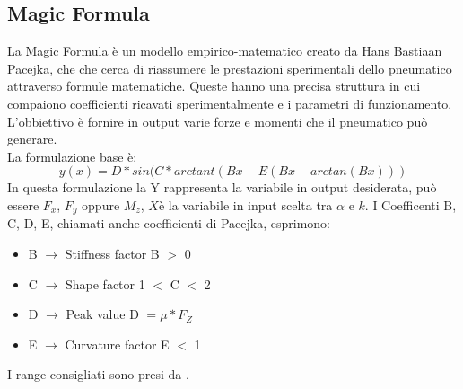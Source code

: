 \subsection{Magic Formula}
La Magic Formula è un modello empirico-matematico creato da Hans Bastiaan Pacejka, che che cerca di riassumere le prestazioni sperimentali dello pneumatico attraverso formule matematiche. Queste hanno una precisa struttura in cui compaiono coefficienti ricavati sperimentalmente e i parametri di funzionamento. L'obbiettivo è fornire in output varie forze e momenti che il pneumatico può generare.\\
La formulazione base è:
\begin{equation}
\label{eq:Pacjeka}
    y(x)=D*sin(C*arctant(Bx-E(Bx-arctan(Bx)))
\end{equation}
In questa formulazione la Y rappresenta la variabile in output desiderata, può essere
$F_x$, $F_y$ oppure $M_z$, $X$è la variabile in input scelta tra $\alpha$ e $k$. I Coefficenti B, C, D, E, chiamati anche coefficienti di Pacejka, esprimono:
\begin{itemize}
    \item B $\longrightarrow$ Stiffness factor \hspace{2.3cm} B $>$ 0
    \item C $\longrightarrow$ Shape factor     \hspace{2.3cm} 1 $<$ C $<$ 2
    \item D $\longrightarrow$ Peak value       \hspace{2.6cm} D $= \mu*F_Z$
    \item E $\longrightarrow$ Curvature factor \hspace{2cm} E $<$ 1
\end{itemize}
I range consigliati sono presi da \cite{Guiggiani}.


